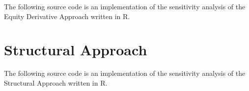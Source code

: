 The following source code is an implementation of the sensitivity analysis of the Equity Derivative Approach \citep{de2011pricing} written in R.
 


\section{Structural Approach}

The following source code is an implementation of the sensitivity analysis of the Structural Approach \citep{pennacchi2010structural} written in R.
 

